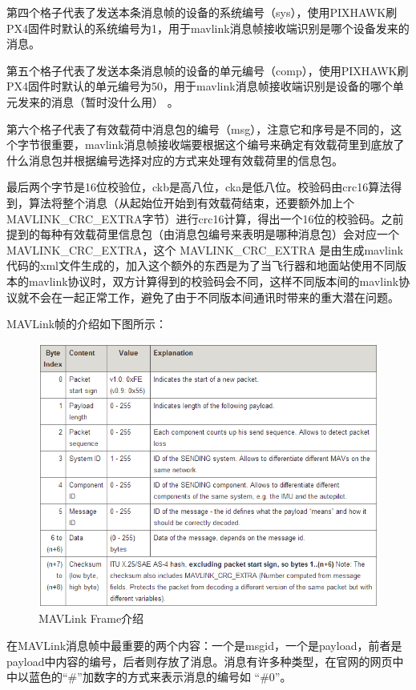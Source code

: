 第四个格子代表了发送本条消息帧的设备的系统编号（sys），使用PIXHAWK刷PX4固件时默认的系统编号为1，用于mavlink消息帧接收端识别是哪个设备发来的消息。

第五个格子代表了发送本条消息帧的设备的单元编号（comp），使用PIXHAWK刷PX4固件时默认的单元编号为50，用于mavlink消息帧接收端识别是设备的哪个单元发来的消息（暂时没什么用） 。

第六个格子代表了有效载荷中消息包的编号（msg），注意它和序号是不同的，这个字节很重要，mavlink消息帧接收端要根据这个编号来确定有效载荷里到底放了什么消息包并根据编号选择对应的方式来处理有效载荷里的信息包。

最后两个字节是16位校验位，ckb是高八位，cka是低八位。校验码由crc16算法得到，算法将整个消息（从起始位开始到有效载荷结束，还要额外加上个MAVLINK\_CRC\_EXTRA字节）进行crc16计算，得出一个16位的校验码。之前提到的每种有效载荷里信息包（由消息包编号来表明是哪种消息包）会对应一个MAVLINK\_CRC\_EXTRA，这个 MAVLINK\_CRC\_EXTRA 是由生成mavlink代码的xml文件生成的，加入这个额外的东西是为了当飞行器和地面站使用不同版本的mavlink协议时，双方计算得到的校验码会不同，这样不同版本间的mavlink协议就不会在一起正常工作，避免了由于不同版本间通讯时带来的重大潜在问题。

MAVLink帧的介绍如下图所示：

\begin{figure}[ht]
  \centering
  \includegraphics[width=0.8\linewidth]{./Figure/Mavlink_Frame_Intro.png}
  \caption{MAVLink Frame介绍}\label{Fig:xd1}
\end{figure}

在MAVLink消息帧中最重要的两个内容：一个是msgid，一个是payload，前者是payload中内容的编号，后者则存放了消息。消息有许多种类型，在官网的网页中中以蓝色的“\#”加数字的方式来表示消息的编号如 “\#0”。

